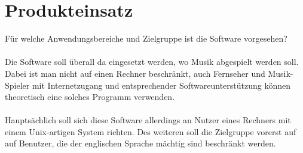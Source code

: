 \chapter{Produkteinsatz}
Für welche Anwendungsbereiche und Zielgruppe ist die Software vorgesehen?\ \\ \\
Die Software soll überall da eingesetzt werden, wo Musik abgespielt werden soll. Dabei ist man nicht auf einen Rechner beschränkt, auch Fernseher und Musik-Spieler mit Internetzugang und entsprechender Softwareunterstützung können theoretisch eine solches Programm verwenden.\ \\ \\
Hauptsächlich soll sich diese Software allerdings an Nutzer eines Rechners mit einem Unix-artigen System richten. Des weiteren soll die Zielgruppe vorerst auf auf Benutzer, die der englischen Sprache mächtig sind beschränkt werden.\ \\ \\